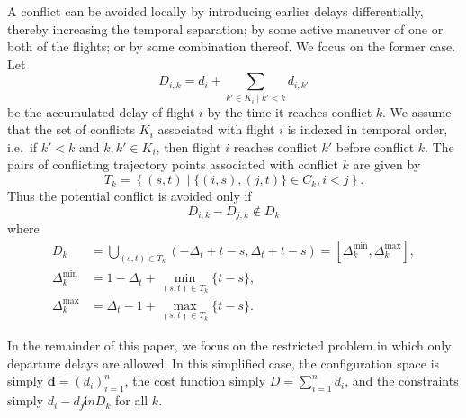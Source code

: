 A conflict can be avoided locally by introducing earlier delays differentially, thereby increasing the temporal separation; by some active maneuver of one or both of the flights; or by some combination thereof.
We focus on the former case.
Let 
\begin{equation}
D_{i, k} = d_i + \sum_{\left.k' \in K_i \middle| k' < k\right.} d_{i,k'}
\end{equation}
be the accumulated delay of flight $i$ by the time it reaches conflict $k$.
We assume that the set of conflicts $K_i$ associated with flight $i$ is indexed in temporal order, i.e.\ if $k' < k$ and $k, k' \in K_i$, then flight $i$ reaches conflict $k'$ before conflict $k$.
The pairs of conflicting trajectory points associated with conflict $k$ are given by 
\begin{equation}
T_k = 
\left\{
(s, t) \middle| \{(i, s), (j, t)\} \in C_k, i < j
\right\}.
\end{equation}
Thus the potential conflict is avoided only if 
\begin{equation}
D_{i, k} - D_{j, k}
\notin
D_k 
\end{equation}
where 
\begin{align}
D_k &= 
\bigcup_{(s, t) \in T_k}
\left(-\Delta_t + t - s, \Delta_t + t - s\right)
=
[\Delta^{\min}_k, \Delta^{\max}_k], \\
\Delta^{\min}_k &= 1 - \Delta_t + \min_{(s, t) \in T_k} \{t - s\},\\
\Delta^{\max}_k &= \Delta_t - 1 + \max_{(s, t) \in T_k} \{t - s\}.
\end{align}


In the remainder of this paper, we focus on the restricted problem in which only departure delays are allowed.
In this simplified case, the configuration space is simply 
$\mathbf d = {\left(d_i\right)}_{i=1}^n$, the cost function simply $D = \sum_{i = 1}^n d_i$, and the constraints simply $d_i - d_j \not in D_k$ for all $k$.
